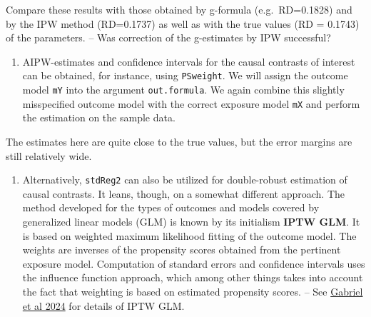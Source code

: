 \documentclass[
]{book}
\newenvironment{Shaded}{\begin{snugshade}}{\end{snugshade}}
\newcommand{\AttributeTok}[1]{\textcolor[rgb]{0.13,0.29,0.53}{#1}}
\newcommand{\DecValTok}[1]{\textcolor[rgb]{0.00,0.00,0.81}{#1}}
\newcommand{\FunctionTok}[1]{\textcolor[rgb]{0.13,0.29,0.53}{\textbf{#1}}}
\newcommand{\NormalTok}[1]{#1}
\newcommand{\OtherTok}[1]{\textcolor[rgb]{0.56,0.35,0.01}{#1}}
\newcommand{\SpecialCharTok}[1]{\textcolor[rgb]{0.81,0.36,0.00}{\textbf{#1}}}
\newcommand{\StringTok}[1]{\textcolor[rgb]{0.31,0.60,0.02}{#1}}
\providecommand{\tightlist}{%
  \setlength{\itemsep}{0pt}\setlength{\parskip}{0pt}}
\begin{document}
Compare these results with those obtained by g-formula (e.g.~RD=0.1828)
and by the IPW method (RD=0.1737) as well as with the true values (RD =
0.1743) of the parameters. -- Was correction of the g-estimates by IPW
successful?

\begin{enumerate}
\def\labelenumi{\arabic{enumi}.}
\setcounter{enumi}{1}
\tightlist
\item
  AIPW-estimates and confidence intervals for the causal contrasts of
  interest can be obtained, for instance, using \texttt{PSweight}. We will
  assign the outcome model \texttt{mY} into the argument \texttt{out.formula}. We
  again combine this slightly misspecified outcome model with the
  correct exposure model \texttt{mX} and perform the estimation on the sample
  data.
\end{enumerate}

\begin{Shaded}
\end{Shaded}

The estimates here are quite close to the true values, but the error
margins are still relatively wide.

\begin{enumerate}
\def\labelenumi{\arabic{enumi}.}
\setcounter{enumi}{2}
\tightlist
\item
  Alternatively, \texttt{stdReg2} can also be utilized for double-robust
  estimation of causal contrasts. It leans, though, on a somewhat
  different approach. The method developed for the types of outcomes
  and models covered by generalized linear models (GLM) is known by
  its initialism \textbf{IPTW GLM}. It is based on weighted maximum
  likelihood fitting of the outcome model. The weights are inverses of
  the propensity scores obtained from the pertinent exposure model.
  Computation of standard errors and confidence intervals uses the
  influence function approach, which among other things takes into
  account the fact that weighting is based on estimated propensity
  scores. -- See \href{https://doi.org/10.1002/sim.9969}{Gabriel et al
  2024} for details of IPTW GLM.
\end{enumerate}
\end{document}
